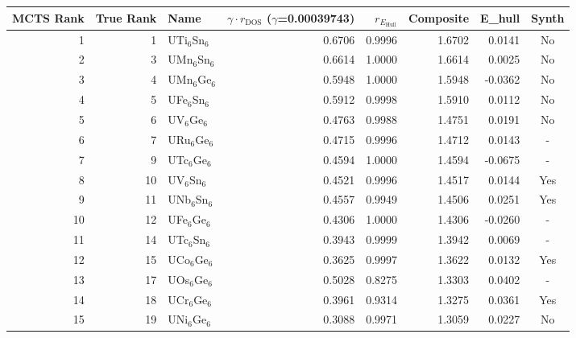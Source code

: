 \begin{tabular}{rrlrrrrc}
\toprule
MCTS Rank & True Rank & Name & $\gamma \cdot r_{\mathrm{DOS}}$ ($\gamma$=0.00039743) & $r_{E_{\mathrm{Hull}}}$ & Composite & E\_hull & Synth \\
\midrule
1 & 1 & UTi$_{6}$Sn$_{6}$ & 0.6706 & 0.9996 & 1.6702 & 0.0141 & No \\
2 & 3 & UMn$_{6}$Sn$_{6}$ & 0.6614 & 1.0000 & 1.6614 & 0.0025 & No \\
3 & 4 & UMn$_{6}$Ge$_{6}$ & 0.5948 & 1.0000 & 1.5948 & -0.0362 & No \\
4 & 5 & UFe$_{6}$Sn$_{6}$ & 0.5912 & 0.9998 & 1.5910 & 0.0112 & No \\
5 & 6 & UV$_{6}$Ge$_{6}$ & 0.4763 & 0.9988 & 1.4751 & 0.0191 & No \\
6 & 7 & URu$_{6}$Ge$_{6}$ & 0.4715 & 0.9996 & 1.4712 & 0.0143 & - \\
7 & 9 & UTc$_{6}$Ge$_{6}$ & 0.4594 & 1.0000 & 1.4594 & -0.0675 & - \\
8 & 10 & UV$_{6}$Sn$_{6}$ & 0.4521 & 0.9996 & 1.4517 & 0.0144 & Yes \\
9 & 11 & UNb$_{6}$Sn$_{6}$ & 0.4557 & 0.9949 & 1.4506 & 0.0251 & Yes \\
10 & 12 & UFe$_{6}$Ge$_{6}$ & 0.4306 & 1.0000 & 1.4306 & -0.0260 & - \\
11 & 14 & UTc$_{6}$Sn$_{6}$ & 0.3943 & 0.9999 & 1.3942 & 0.0069 & - \\
12 & 15 & UCo$_{6}$Ge$_{6}$ & 0.3625 & 0.9997 & 1.3622 & 0.0132 & Yes \\
13 & 17 & UOs$_{6}$Ge$_{6}$ & 0.5028 & 0.8275 & 1.3303 & 0.0402 & - \\
14 & 18 & UCr$_{6}$Ge$_{6}$ & 0.3961 & 0.9314 & 1.3275 & 0.0361 & Yes \\
15 & 19 & UNi$_{6}$Ge$_{6}$ & 0.3088 & 0.9971 & 1.3059 & 0.0227 & No \\
\bottomrule
\end{tabular}
